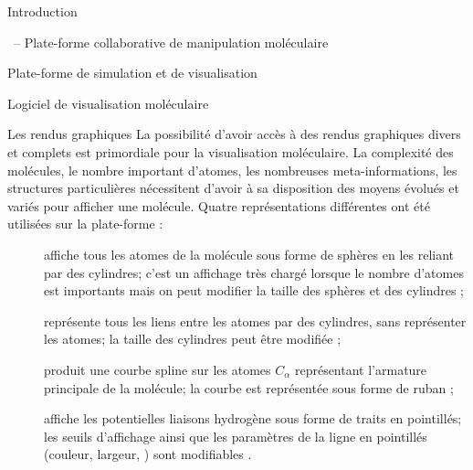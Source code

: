 \documentclass[myfrancais]{mythesis}
\begin{document}
\begin{mypart}{Introduction}
\begin{mychapter}{\myShaddock\ -- Plate-forme collaborative de manipulation moléculaire}
\begin{mysection}{Plate-forme de simulation et de visualisation}
\begin{mysubsection}{Logiciel de visualisation moléculaire}
					\begin{mysubsubsection}{Les rendus graphiques}
						La possibilité d'avoir accès à des rendus graphiques divers et complets est primordiale pour la visualisation moléculaire.
						La complexité des molécules, le nombre important d'atomes, les nombreuses meta-informations, les structures particulières nécessitent d'avoir à sa disposition des moyens évolués et variés pour afficher une molécule.
						Quatre représentations différentes  ont été utilisées sur la plate-forme \myShaddock :
						\begin{description}
							\item[\myCPK] affiche tous les atomes de la molécule sous forme de sphères en les reliant par des cylindres; c'est un affichage très chargé lorsque le nombre d'atomes est importants mais on peut modifier la taille des sphères et des cylindres ;
							\item[\myLicorice] représente tous les liens entre les atomes par des cylindres, sans représenter les atomes; la taille des cylindres peut être modifiée ;
							\item[\myNewRibbon] produit une courbe spline sur les atomes $C_{\alpha}$ représentant l'armature principale de la molécule; la courbe est représentée sous forme de ruban ;
							\item[\myHBonds] affiche les potentielles liaisons hydrogène sous forme de traits en pointillés; les seuils d'affichage ainsi que les paramètres de la ligne en pointillés (couleur, largeur, \myetc) sont modifiables .
						\end{description}


\end{mysubsubsection}
\end{mysubsection}
\end{mysection}
\end{mychapter}
\end{mypart}
\end{document}
